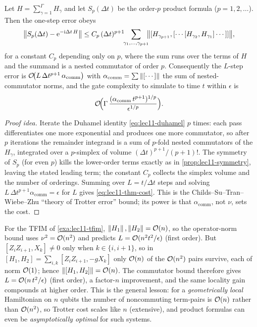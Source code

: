\begin{theorem}
\label{thm:lec11-commutator}
Let $H=\sum_{\gamma=1}^{\Gamma}H_\gamma$ and let $S_p(\Delta t)$ be the order-$p$ product
formula ($p=1,2,\dots$). Then the one-step error obeys
\begin{equation}
  \left\lVert S_p(\Delta t)-\mathrm{e}^{-\mathrm{i}\Delta t\,H} \right\rVert
  \le C_p\,(\Delta t)^{p+1}
  \!\!\sum_{\gamma_1,\dots,\gamma_{p+1}}\!\!
  \bigl\|[H_{\gamma_{p+1}},[\cdots[H_{\gamma_2},H_{\gamma_1}]\cdots]]\bigr\|,
  \label{eq:lec11-thm}
\end{equation}
for a constant $C_p$ depending only on $p$, where the sum runs over the terms of $H$ and
the summand is a nested commutator of order $p$. Consequently the $L$-step error is
$\mathcal{O}\!\bigl(L\,\Delta t^{p+1}\,\alpha_{\mathrm{comm}}\bigr)$ with
$\alpha_{\mathrm{comm}}=\sum\left\lVert [\cdots] \right\rVert$ the sum of nested-commutator norms, and the
gate complexity to simulate to time $t$ within $\epsilon$ is
\begin{equation}
  \mathcal{O}\!\Bigl(\Gamma\,\frac{(\alpha_{\mathrm{comm}}\,t^{p+1})^{1/p}}{\epsilon^{1/p}}\Bigr).
  \label{eq:lec11-thm-cost}
\end{equation}
\end{theorem}

\begin{proof}[Proof idea]
Iterate the Duhamel identity \eqref{eq:lec11-duhamel} $p$ times: each pass differentiates
one more exponential and produces one more commutator, so after $p$ iterations the
remainder integrand is a sum of $p$-fold nested commutators of the $H_\gamma$, integrated
over a $p$-simplex of volume $(\Delta t)^{p+1}/(p+1)!$. The symmetry of $S_p$ (for even
$p$) kills the lower-order terms exactly as in \cref{prop:lec11-symmetry}, leaving the
stated leading term; the constant $C_p$ collects the simplex volume and the number of
orderings. Summing over $L=t/\Delta t$ steps and solving
$L\,\Delta t^{p+1}\alpha_{\mathrm{comm}}=\epsilon$ for $L$ gives \eqref{eq:lec11-thm-cost}.
This is the Childs--Su--Tran--Wiebe--Zhu ``theory of Trotter error'' bound; its power is
that $\alpha_{\mathrm{comm}}$, not $\nu$, sets the cost.
\end{proof}

\begin{example}
\label{exa:lec11-commutator}
For the TFIM of \cref{exa:lec11-tfim}, $\left\lVert H_1 \right\rVert,\left\lVert H_2 \right\rVert=\mathcal{O}(n)$, so the
operator-norm bound uses $\nu^2=\mathcal{O}(n^2)$ and predicts $L=\mathcal{O}(n^2t^2/\epsilon)$ (first
order). But $[Z_iZ_{i+1},X_k]\neq0$ only when $k\in\{i,i+1\}$, so in
$[H_1,H_2]=\sum_{i,k}[Z_iZ_{i+1},-gX_k]$ only $\mathcal{O}(n)$ of the $\mathcal{O}(n^2)$ pairs survive,
each of norm $\mathcal{O}(1)$; hence $\left\lVert [H_1,H_2] \right\rVert=\mathcal{O}(n)$. The commutator bound therefore
gives $L=\mathcal{O}(n\,t^2/\epsilon)$ (first order), a factor-$n$ improvement, and the same
locality gain compounds at higher order. This is the general lesson: for a
\emph{geometrically local} Hamiltonian on $n$ qubits the number of noncommuting term-pairs
is $\mathcal{O}(n)$ rather than $\mathcal{O}(n^2)$, so Trotter cost scales like $n$ (extensive), and
product formulas can even be \emph{asymptotically optimal} for such systems.
\end{example}

